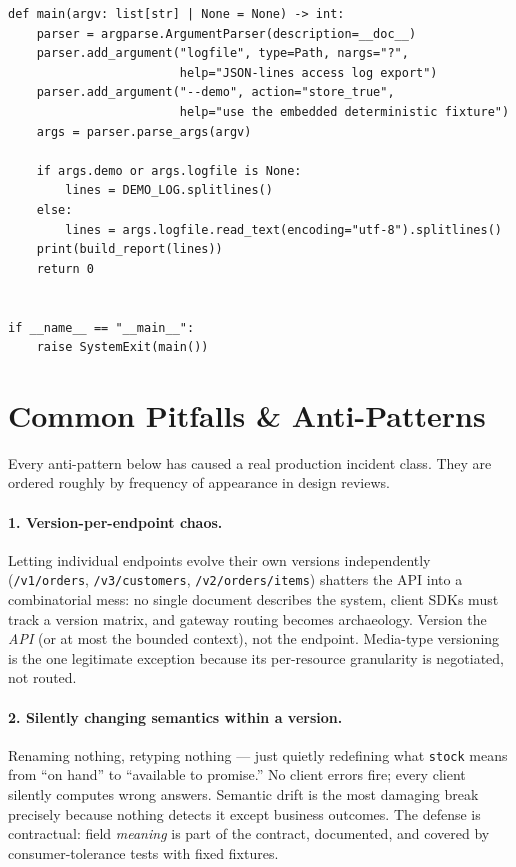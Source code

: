 \begin{verbatim}
def main(argv: list[str] | None = None) -> int:
    parser = argparse.ArgumentParser(description=__doc__)
    parser.add_argument("logfile", type=Path, nargs="?",
                        help="JSON-lines access log export")
    parser.add_argument("--demo", action="store_true",
                        help="use the embedded deterministic fixture")
    args = parser.parse_args(argv)

    if args.demo or args.logfile is None:
        lines = DEMO_LOG.splitlines()
    else:
        lines = args.logfile.read_text(encoding="utf-8").splitlines()
    print(build_report(lines))
    return 0


if __name__ == "__main__":
    raise SystemExit(main())
\end{verbatim}

\section{Common Pitfalls \& Anti-Patterns}
\label{sec:ch9-pitfalls}

\begin{warningbox}
Every anti-pattern below has caused a real production incident class. They
are ordered roughly by frequency of appearance in design reviews.
\end{warningbox}

\paragraph{1. Version-per-endpoint chaos.}
Letting individual endpoints evolve their own versions independently
(\texttt{/v1/orders}, \texttt{/v3/customers}, \texttt{/v2/orders/items})
shatters the API into a combinatorial mess: no single document describes the
system, client SDKs must track a version matrix, and gateway routing becomes
archaeology. Version the \emph{API} (or at most the bounded context), not the
endpoint. Media-type versioning is the one legitimate exception because its
per-resource granularity is negotiated, not routed.

\paragraph{2. Silently changing semantics within a version.}
Renaming nothing, retyping nothing --- just quietly redefining what
\texttt{stock} means from ``on hand'' to ``available to promise.'' No client
errors fire; every client silently computes wrong answers. Semantic drift is
the most damaging break precisely because nothing detects it except business
outcomes. The defense is contractual: field \emph{meaning} is part of the
contract, documented, and covered by consumer-tolerance tests with fixed
fixtures.

